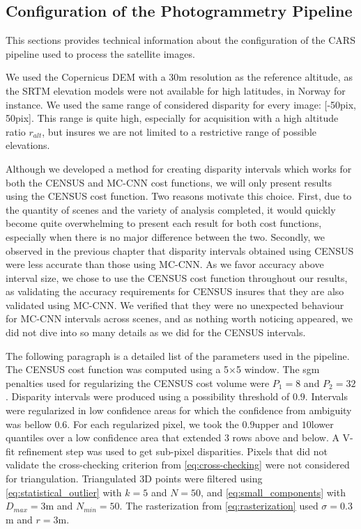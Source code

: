 \subsection{Configuration of the Photogrammetry Pipeline}
This sections provides technical information about the configuration of the CARS pipeline used to process the satellite images.

We used the Copernicus DEM with a 30m resolution as the reference altitude, as the SRTM elevation models were not available for high latitudes, in Norway for instance. We used the same range of considered disparity for every image: [-50pix, 50pix]. This range is quite high, especially for acquisition with a high altitude ratio $r_{alt}$, but insures we are not limited to a restrictive range of possible elevations.

Although we developed a method for creating disparity intervals which works for both the CENSUS and MC-CNN cost functions, we will only present results using the CENSUS cost function. Two reasons motivate this choice. First, due to the quantity of scenes and the variety of analysis completed, it would quickly become quite overwhelming to present each result for both cost functions, especially when there is no major difference between the two. Secondly, we observed in the previous chapter that disparity intervals obtained using CENSUS were less accurate than those using MC-CNN. As we favor accuracy above interval size, we chose to use the CENSUS cost function throughout our results, as validating the accuracy requirements for CENSUS insures that they are also validated using MC-CNN. We verified that they were no unexpected behaviour for MC-CNN intervals across scenes, and as nothing worth noticing appeared, we did not dive into so many details as we did for the CENSUS intervals.  

The following paragraph is a detailed list of the parameters used in the pipeline. The CENSUS cost function was computed using a 5$\times$5 window. The \acrshort{sgm} penalties used for regularizing the CENSUS cost volume were $P_1=8$ and $P_2=32$. Disparity intervals were produced using a possibility threshold of $0.9$. Intervals were regularized in low confidence areas for which the confidence from ambiguity was bellow $0.6$. For each regularized pixel, we took the $0.9$\ith upper and $10$\ith lower quantiles over a low confidence area that extended 3 rows above and below. A V-fit refinement step was used to get sub-pixel disparities. Pixels that did not validate the cross-checking criterion from \cref{eq:cross-checking} were not considered for triangulation. Triangulated 3D points were filtered using \cref{eq:statistical_outlier} with $k=5$ and $N=50$, and \cref{eq:small_components} with $D_{max}=3$m and $N_{min}=50$. The rasterization from \cref{eq:rasterization} used $\sigma=0.3$m and $r=3$m.


